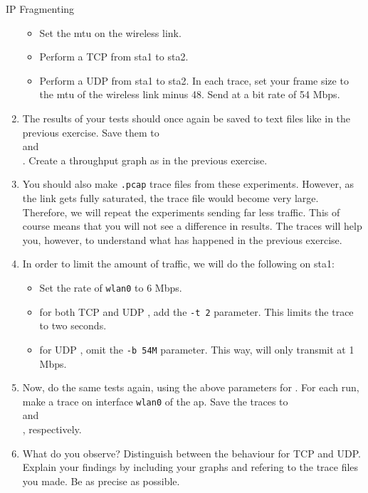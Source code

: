 \begin{exercise}{IP Fragmenting}
\begin{enumerate}
\begin{itemize}
			\item Set the \ac{mtu} on the wireless link.
			\item Perform a TCP  from \ac{sta}1 to \ac{sta}2.
			\item Perform a UDP  from \ac{sta}1 to \ac{sta}2. In each trace, set your frame size to the \ac{mtu} of the wireless link minus 48. Send at a bit rate of 54 Mbps.
		\end{itemize}
		\item The results of your tests should once again be saved to text files like in the previous exercise. Save them to \\ and \\. Create a throughput graph as in the previous exercise.
		\item You should also make \texttt{.pcap} trace files from these experiments. However, as the link gets fully saturated, the trace file would become very large. Therefore, we will repeat the experiments sending far less traffic. This of course means that you will not see a difference in  results. The traces will help you, however, to understand what has happened in the previous exercise.
		\item In order to limit the amount of traffic, we will do the following on \ac{sta}1:
		\begin{itemize}
		\item Set the rate of \texttt{wlan0} to 6 Mbps.
		\item for both TCP and UDP , add the \texttt{-t 2} parameter. This limits the  trace to two seconds.
		\item for UDP , omit the \texttt{-b 54M} parameter. This way,  will only transmit at 1 Mbps.
		\end{itemize}
		\item Now, do the same  tests again, using the above parameters for . For each run, make a  trace on interface \texttt{wlan0} of the \ac{ap}. Save the traces to \\ and \\, respectively.
		\item What do you observe? Distinguish between the behaviour for TCP and UDP. Explain your findings by including your graphs and refering to the trace files you made. Be as precise as possible.\newline
		\begin{esolution}
		
		\end{esolution}
 
	\end{enumerate}	
\end{exercise}